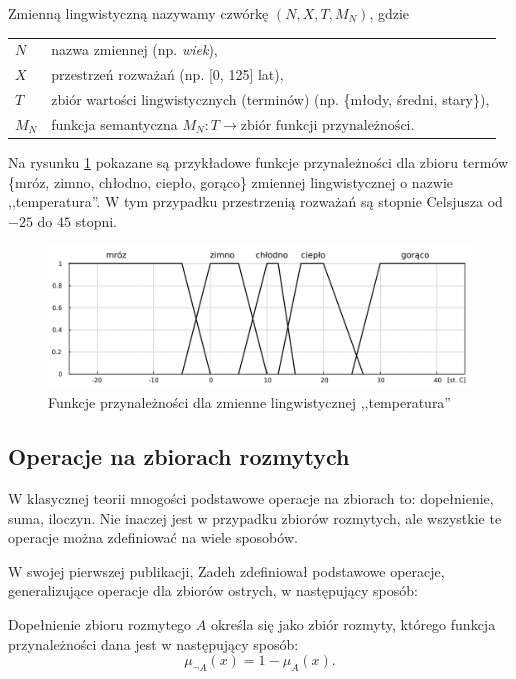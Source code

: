 \begin{definition} Zmienną lingwistyczną nazywamy czwórkę $(N,X,T,M_N)$, gdzie

\begin{tabular}{ll}
  $N$ & \qquad nazwa zmiennej (np. \textit{wiek}), \\
  $X$ & \qquad przestrzeń rozważań (np. [0, 125] lat), \\
  $T$ & \qquad zbiór wartości lingwistycznych (terminów) (np. \{młody, średni,
  stary\}), \\
  $M_N$ & \qquad funkcja semantyczna $M_N : T \rightarrow \textrm{zbiór funkcji
  przynależności}$.
\end{tabular}
\end{definition}

Na rysunku \ref{fig:zmienna_lingwistyczna} pokazane są przykładowe funkcje
przynależności dla zbioru termów \{mróz, zimno, chłodno, ciepło, gorąco\}
zmiennej lingwistycznej o nazwie ,,temperatura''. W tym przypadku przestrzenią
rozważań są stopnie Celsjusza od $-25$ do $45$ stopni.

\begin{figure}[ht]
  \includegraphics[width=\linewidth]
  	{chapters/fuzzylogic/zmienna_lingwistyczna}
  \caption{Funkcje przynależności dla zmienne lingwistycznej ,,temperatura''}
  \label{fig:zmienna_lingwistyczna}
\end{figure}

\subsection{Operacje na zbiorach rozmytych}
W klasycznej teorii mnogości podstawowe operacje na zbiorach to: dopełnienie,
suma, iloczyn. Nie inaczej jest w przypadku zbiorów rozmytych, ale wszystkie te
operacje można zdefiniować na wiele sposobów.

W swojej pierwszej publikacji, Zadeh zdefiniował podstawowe operacje,
generalizujące operacje dla zbiorów ostrych, w następujący sposób:

\begin{definition}
Dopełnienie zbioru rozmytego $A$ określa się jako zbiór rozmyty, którego funkcja
przynależności dana jest w następujący sposób:
\begin{equation}
\mu_{\neg A}(x) = 1 - \mu_A(x).
\end{equation}
\end{definition}

